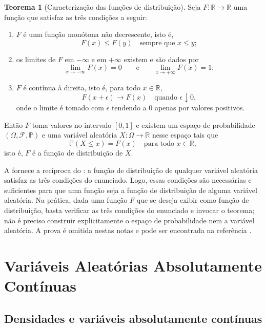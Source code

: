 \documentclass[12pt,portuguese]{article}
\theoremstyle{definition}
\newtheorem{theorem}{Teorema}
\theoremstyle{plainexercise}
\theoremstyle{starredexercise}
\theoremstyle{definition}
\begin{document}
\begin{theorem}[Caracterização das funções de distribuição]
\label{thm:caracterizacao-fd}
Seja $F:\mathbb{R}\to\mathbb{R}$ uma função que satisfaz as três condições a
seguir:
\begin{enumerate}[label=\textup{(\roman*)}]
  \item $F$ é uma função monótona não decrescente, isto é,
    \[
      F(x)\leqslant F(y)\quad\text{sempre que } x\leqslant y;
    \]
  \item os limites de $F$ em $-\infty$ e em $+\infty$ existem e são dados por
    \[
      \lim_{x\to-\infty}F(x)=0
      \qquad\text{e}\qquad
      \lim_{x\to+\infty}F(x)=1;
    \]
  \item $F$ é contínua à direita, isto é, para todo $x\in\mathbb{R}$,
    \[
      F(x+\epsilon)\to F(x)\quad\text{quando } \epsilon\downarrow 0,
    \]
    onde o limite é tomado com $\epsilon$ tendendo a $0$ apenas por valores
    positivos.
\end{enumerate}
Então $F$ toma valores no intervalo $[0,1]$ e existem um espaço de
probabilidade $(\Omega,\mathcal{F},\mathbb{P})$ e uma variável aleatória
$X:\Omega\to\mathbb{R}$ nesse espaço tais que
\[
  \mathbb{P}(X\leqslant x)=F(x)\quad\text{para todo } x\in\mathbb{R},
\]
isto é, $F$ é a função de distribuição de $X$.
\end{theorem}

A  fornece a recíproca do
: a função de distribuição de qualquer variável
aleatória satisfaz as três condições do enunciado. Logo, essas condições são
necessárias e suficientes para que uma função seja a função de distribuição de
alguma variável aleatória. Na prática, dada uma função $F$ que se deseja
exibir como função de distribuição, basta verificar as três condições do
enunciado e invocar o teorema; não é preciso construir explicitamente o espaço
de probabilidade nem a variável aleatória. A prova é omitida nestas notas e
pode ser encontrada na referência \cite{MR2893652}.

\section{Variáveis Aleatórias Absolutamente Contínuas}\label{sec:va-continuas}

\subsection{Densidades e variáveis absolutamente contínuas}
\end{document}
